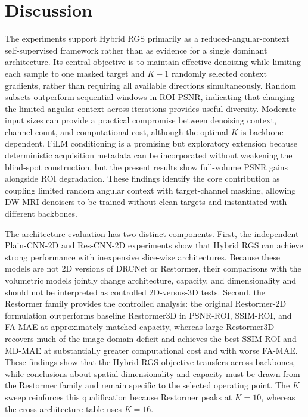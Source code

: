 \documentclass[preprint,12pt]{elsarticle}
\begin{document}
\section{Discussion}
The experiments support Hybrid RGS primarily as a reduced-angular-context self-supervised framework rather than as evidence for a single dominant architecture. Its central objective is to maintain effective denoising while limiting each sample to one masked target and $K-1$ randomly selected context gradients, rather than requiring all available directions simultaneously. Random subsets outperform sequential windows in ROI PSNR, indicating that changing the limited angular context across iterations provides useful diversity. Moderate input sizes can provide a practical compromise between denoising context, channel count, and computational cost, although the optimal $K$ is backbone dependent. FiLM conditioning is a promising but exploratory extension because deterministic acquisition metadata can be incorporated without weakening the blind-spot construction, but the present results show full-volume PSNR gains alongside ROI degradation. These findings identify the core contribution as coupling limited random angular context with target-channel masking, allowing DW-MRI denoisers to be trained without clean targets and instantiated with different backbones.

The architecture evaluation has two distinct components. First, the independent Plain-CNN-2D and Res-CNN-2D experiments show that Hybrid RGS can achieve strong performance with inexpensive slice-wise architectures. Because these models are not 2D versions of DRCNet or Restormer, their comparisons with the volumetric models jointly change architecture, capacity, and dimensionality and should not be interpreted as controlled 2D-versus-3D tests. Second, the Restormer family provides the controlled analysis: the original Restormer-2D formulation outperforms baseline Restormer3D in PSNR-ROI, SSIM-ROI, and FA-MAE at approximately matched capacity, whereas large Restormer3D recovers much of the image-domain deficit and achieves the best SSIM-ROI and MD-MAE at substantially greater computational cost and with worse FA-MAE. These findings show that the Hybrid RGS objective transfers across backbones, while conclusions about spatial dimensionality and capacity must be drawn from the Restormer family and remain specific to the selected operating point. The $K$ sweep reinforces this qualification because Restormer peaks at $K=10$, whereas the cross-architecture table uses $K=16$.
\end{document}
